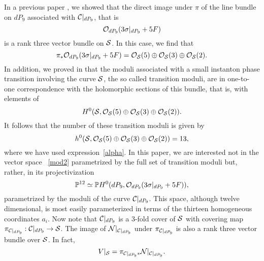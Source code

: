 \documentclass[a4paper,12pt]{article}
\numberwithin{equation}{section}
\theoremstyle{plain}
\begin{document}
In a previous paper
\cite{BDOold}, we showed that the direct image under $\pi$ of the line
bundle
on $dP_9$ associated with ${\cal C}|_{dP_9}$, that is
%
\begin{equation}
{\cal O}_{dP_9}(3 \sigma|_{dP_9} + 5 F)
\label{46}
\end{equation}
%
is a rank three vector bundle on ${\cal S}$. In this case, we find that
%
\begin{equation}
\pi_{*} {\cal O}_{dP_9} (3 \sigma|_{dP_9} + 5F) =
{\cal O}_{{\cal S}}(5) \oplus {\cal O}_{{\cal S}}(3) \oplus
{\cal O}_{{\cal S}}(2).
\label{mod1}
\end{equation}
%
In addition, we proved in \cite{BDOold} that the moduli associated with
a small instanton phase transition involving the curve ${\cal S}$,
the so called transition moduli, are in one-to-one
correspondence with the holomorphic sections of this bundle, that is,
with elements of
%
\begin{equation}
H^{0}({\cal S}, {\cal O}_{{\cal S}}(5) \oplus {\cal O}_{{\cal S}}(3)
\oplus
{\cal O}_{{\cal S}}(2)).
\label{mod2}
\end{equation}
%
It follows that the number of these transition moduli is given by
%
\begin{equation}
h^{0}({\cal S}, {\cal O}_{{\cal S}}(5) \oplus {\cal O}_{{\cal S}}(3)
\oplus {\cal O}_{{\cal S}}(2)) =13,
\label{47}
\end{equation}
where we have used expression~\eqref{alpha}.
In this paper, we are interested not in the
vector space ~\eqref{mod2} parametrized by the
full set of transition moduli but,
rather, in its projectivization
%
\begin{equation}
{\mathbb P}^{12} \simeq  {\mathbb P}H^{0}(dP_9, {\cal O}_{dP_9}(3
\sigma|_{dP_9} +5F)),
\label{rock4}
\end{equation}
%
parametrized by
the moduli of
the curve
${\cal{C}}|_{dP_{9}}$.
This space, although twelve dimensional, is most easily parameterized in
terms
of the thirteen homogeneous coordinates $a_{i}$.
Now note that ${\cal C}|_{dP_9}$ is a $3$-fold cover of ${\cal S}$ with
covering map
$\pi_{{\cal C}|_{dP_9}}:{\cal C}|_{dP_9} \to {\cal S}$.
The image of ${\cal N}|_{{\cal C}|_{dP_9}}$
under $\pi_{{{\cal C}}|_{dP_9}}$ is also
a rank three vector bundle over ${\cal S}$. In fact,
%
\begin{equation}
V|_{{\cal S}} =\pi_{{\cal C}|_{dP_9}*}{\cal N}|_{{\cal{C}}|_{dP_9}}.
\label{ccc}
\end{equation}
%
\end{document}
